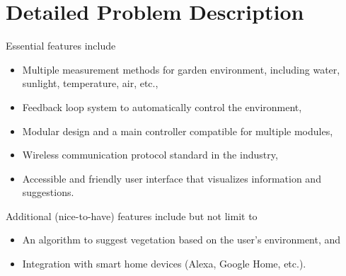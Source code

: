 \section{Detailed Problem Description}
	\noindent Essential features include
	\begin{itemize}
		\item Multiple measurement methods for garden environment, including water, sunlight, temperature, air, etc.,
		\item Feedback loop system to automatically control the environment,
		\item Modular design and a main controller compatible for multiple modules,
		\item Wireless communication protocol standard in the industry,
		\item Accessible and friendly user interface that visualizes information and suggestions.
	\end{itemize}
	Additional (nice-to-have) features include but not limit to
	\begin{itemize}
		\item An algorithm to suggest vegetation based on the user's environment, and
		\item Integration with smart home devices (Alexa, Google Home, etc.).
	\end{itemize}
